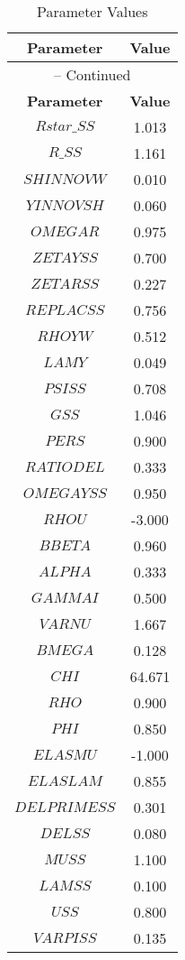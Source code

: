 \begin{center}
\begin{longtable}{cc}
\caption{Parameter Values}\\%
\toprule%
\multicolumn{1}{c}{\textbf{Parameter}} &
\multicolumn{1}{c}{\textbf{Value}}  \\%
\midrule%
\endfirsthead
\multicolumn{2}{c}{{\tablename} \thetable{} -- Continued}\\%
\midrule%
\multicolumn{1}{c}{\textbf{Parameter}} &
\multicolumn{1}{c}{\textbf{Value}} \\%
\midrule%
\endhead
$Rstar\_SS$ 	 & 	 1.013 \\
$R\_SS$ 	 & 	 1.161 \\
$SHINNOVW$ 	 & 	 0.010 \\
$YINNOVSH$ 	 & 	 0.060 \\
$OMEGAR$ 	 & 	 0.975 \\
$ZETAYSS$ 	 & 	 0.700 \\
$ZETARSS$ 	 & 	 0.227 \\
$REPLACSS$ 	 & 	 0.756 \\
$RHOYW$ 	 & 	 0.512 \\
$LAMY$ 	 & 	 0.049 \\
$PSISS$ 	 & 	 0.708 \\
$GSS$ 	 & 	 1.046 \\
$PERS$ 	 & 	 0.900 \\
$RATIODEL$ 	 & 	 0.333 \\
$OMEGAYSS$ 	 & 	 0.950 \\
$RHOU$ 	 & 	 -3.000 \\
$BBETA$ 	 & 	 0.960 \\
$ALPHA$ 	 & 	 0.333 \\
$GAMMAI$ 	 & 	 0.500 \\
$VARNU$ 	 & 	 1.667 \\
$BMEGA$ 	 & 	 0.128 \\
$CHI$ 	 & 	 64.671 \\
$RHO$ 	 & 	 0.900 \\
$PHI$ 	 & 	 0.850 \\
$ELASMU$ 	 & 	 -1.000 \\
$ELASLAM$ 	 & 	 0.855 \\
$DELPRIMESS$ 	 & 	 0.301 \\
$DELSS$ 	 & 	 0.080 \\
$MUSS$ 	 & 	 1.100 \\
$LAMSS$ 	 & 	 0.100 \\
$USS$ 	 & 	 0.800 \\
$VARPISS$ 	 & 	 0.135 \\

\end{longtable}
\end{center}
